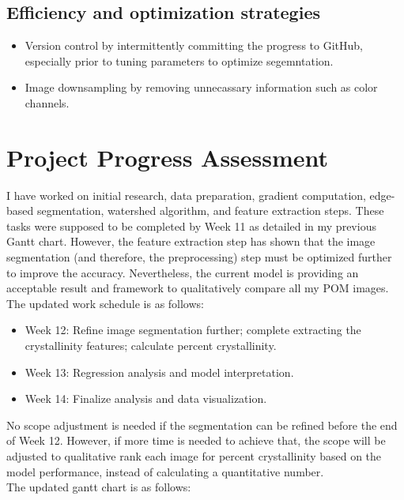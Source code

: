 \documentclass[12pt]{article}
\begin{document}
\subsection{Efficiency and optimization strategies}
\begin{itemize}
    \item Version control by intermittently committing the progress to  GitHub, especially prior to tuning parameters to optimize segemntation.
    \item Image downsampling by removing unnecassary information such as color channels. 
\end{itemize}

\section{Project Progress Assessment}

I have worked on initial research, data preparation, gradient computation, edge-based segmentation, watershed algorithm, and feature extraction steps.
These tasks were supposed to be completed by Week 11 as detailed in my previous Gantt chart. 
However, the feature extraction step has shown that the image segmentation (and therefore, the preprocessing) step must be optimized further to improve the accuracy. 
Nevertheless, the current model is providing an acceptable result and framework to qualitatively compare all my POM images.\\

The updated work schedule is as follows:
\begin{itemize}
    \item Week 12: Refine image segmentation further; complete extracting the crystallinity features; calculate percent crystallinity.
    \item Week 13: Regression analysis and model interpretation.
    \item Week 14: Finalize analysis and data visualization. 
\end{itemize}

No scope adjustment is needed if the segmentation can be refined before the end of Week 12. 
However, if more time is needed to achieve that, the scope will be adjusted to qualitative rank each image for 
percent crystallinity based on the model performance, instead of calculating a quantitative number.\\

The updated gantt chart is as follows:
\end{document}
